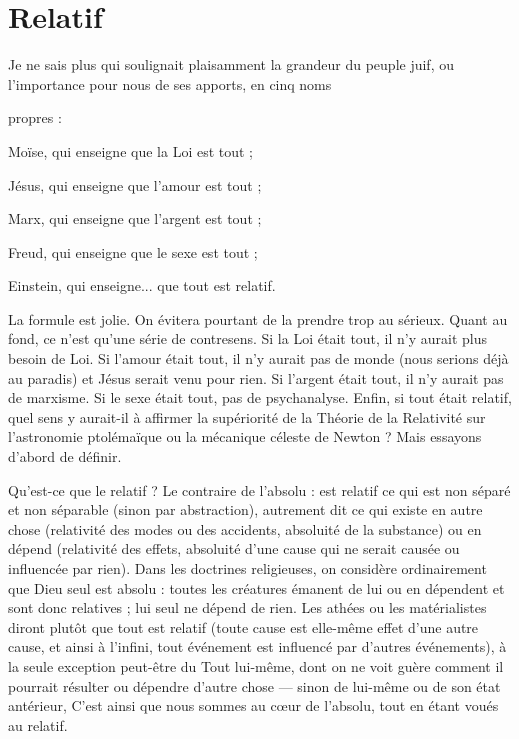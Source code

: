 \section{Relatif}
Je ne sais plus qui soulignait plaisamment la grandeur du peuple
juif, ou l'importance pour nous de ses apports, en cinq noms

propres :

Moïse, qui enseigne que la Loi est tout ;

Jésus, qui enseigne que l’amour est tout ;

Marx, qui enseigne que l’argent est tout ;

Freud, qui enseigne que le sexe est tout ;

Einstein, qui enseigne... que tout est relatif.

La formule est jolie. On évitera pourtant de la prendre trop au sérieux.
Quant au fond, ce n’est qu’une série de contresens. Si la Loi était tout, il n’y
aurait plus besoin de Loi. Si l'amour était tout, il n’y aurait pas de monde (nous
serions déjà au paradis) et Jésus serait venu pour rien. Si l’argent était tout, il
n'y aurait pas de marxisme. Si le sexe était tout, pas de psychanalyse. Enfin, si
tout était relatif, quel sens y aurait-il à affirmer la supériorité de la Théorie de
la Relativité sur l’astronomie ptolémaïque ou la mécanique céleste de Newton ?
Mais essayons d’abord de définir.

Qu'est-ce que le relatif ? Le contraire de l'absolu : est relatif ce qui est non
séparé et non séparable (sinon par abstraction), autrement dit ce qui existe en
autre chose (relativité des modes ou des accidents, absoluité de la substance) ou
en dépend (relativité des effets, absoluité d’une cause qui ne serait causée ou
influencée par rien). Dans les doctrines religieuses, on considère ordinairement
que Dieu seul est absolu : toutes les créatures émanent de lui ou en dépendent
et sont donc relatives ; lui seul ne dépend de rien. Les athées ou les matérialistes
diront plutôt que tout est relatif (toute cause est elle-même effet d’une autre
cause, et ainsi à l'infini, tout événement est influencé par d’autres événements),
à la seule exception peut-être du Tout lui-même, dont on ne voit guère comment
il pourrait résulter ou dépendre d’autre chose — sinon de lui-même ou de
son état antérieur, C’est ainsi que nous sommes au cœur de l'absolu, tout en
étant voués au relatif.

